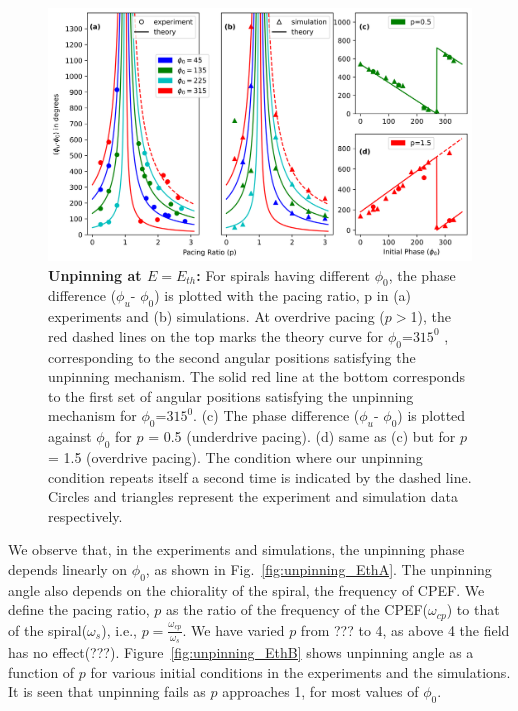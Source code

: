 \begin{figure}[htb!]
    \centering
    \includegraphics[scale=0.7]{Fig2.png}
    \caption{\textbf{Unpinning at $E = E_{th}$:} For spirals having different
	${\phi}_0$,  the phase difference (${\phi}_u$- ${\phi}_0$) is plotted
	with the pacing ratio, p in (a) experiments and (b) simulations. At
	overdrive pacing ($p>$1), the red dashed lines on the top marks the
	theory curve for ${\phi}_0$=$315^0$ , corresponding to the second
	angular positions satisfying the unpinning mechanism. The solid red
	line at the bottom corresponds to the first set of angular positions
	satisfying the unpinning mechanism for ${\phi}_0$=$315^0$.
    (c) The phase difference (${\phi}_u$- ${\phi}_0$) is plotted against
	${\phi}_0$ for $p$ = 0.5 (underdrive pacing). (d) same as (c) but for
	$p$ = 1.5 (overdrive pacing). The condition where our unpinning
	condition repeats itself a second time is indicated by the dashed line.
	Circles and triangles represent the experiment and simulation data
	respectively.  
    }
    \label{fig:unpinning_Eth}
\end{figure}


We observe that, in the experiments and simulations, the unpinning phase
depends linearly on $\phi_0$, as shown in Fig.~\ref{fig:unpinning_EthA}.  The
unpinning angle also depends on the chiorality of the spiral, the frequency of
CPEF. We define the pacing ratio, $p$ as the ratio of the frequency of the
CPEF($\omega_{cp}$) to that of the spiral($\omega_s$), {i.e.,} \( p=
\frac{\omega_{cp}}{\omega_{s}}\). We have varied $p$ from ??? to 4, as above 4
the field has no effect(???). Figure~\ref{fig:unpinning_EthB} shows unpinning
angle as a function of $p$ for various initial conditions in the experiments
and the simulations. It is seen that unpinning fails as $p$ approaches 1, for
most values of $\phi_0$. 

